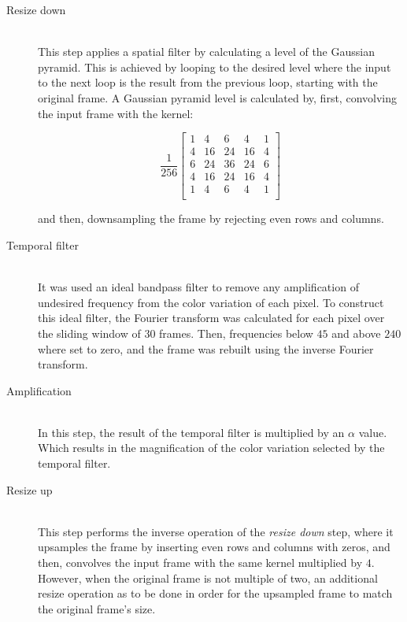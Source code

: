 \begin{description}
  \item[Resize down]\hfill\\
        This step applies a spatial filter by calculating a level of the
        Gaussian pyramid. This is achieved by looping to the desired
        level where the input to the next loop is the result from the previous
        loop, starting with the original frame. A Gaussian pyramid level is
        calculated by, first, convolving the input frame with the kernel:

        \begin{equation}
          \frac{1}{256}
          \begin{bmatrix}
             1 &  4 &  6 &  4 &  1 \\
             4 & 16 & 24 & 16 &  4 \\
             6 & 24 & 36 & 24 &  6 \\
             4 & 16 & 24 & 16 &  4 \\
             1 &  4 &  6 &  4 &  1 \\
          \end{bmatrix}
        \end{equation}

        and then, downsampling the frame by rejecting even rows and columns.

  \item[Temporal filter]\hfill\\
        It was used an ideal bandpass filter to remove any amplification of
        undesired frequency from the color variation of each pixel.
        To construct this ideal filter, the Fourier transform was calculated
        for each pixel over the sliding window of $30$ frames. Then,
        frequencies below $45$ and above $240$ where set to zero, and the frame
        was rebuilt using the inverse Fourier transform.

  \item[Amplification]\hfill\\
        In this step, the result of the temporal filter is multiplied by an
        $\alpha$ value. Which results in the magnification of the color
        variation selected by the temporal filter.

  \item[Resize up]\hfill\\
        This step performs the inverse operation of the \emph{resize down} step,
        where it upsamples the frame by inserting even rows and columns with
        zeros, and then, convolves the input frame with the same kernel
        multiplied by $4$. However, when the original frame is not multiple of
        two, an additional resize operation as to be done in order for the
        upsampled frame to match the original frame's size.
\end{description}

